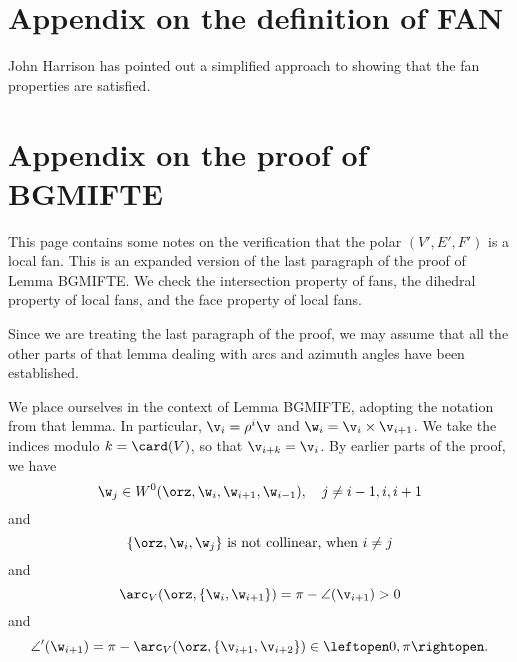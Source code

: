 
\newpage

\section{Appendix on the definition of FAN}

John Harrison has pointed out a simplified approach to showing that
the fan properties are satisfied.

\newpage
\section{Appendix on the proof of BGMIFTE}

This page contains some notes on the verification that the polar $(V',E',F')$ is
a local fan.   This is an expanded version of  the last paragraph
of the proof of Lemma BGMIFTE.
We check the intersection property of fans, the dihedral property
of local fans, and the face property of local fans.

Since we are treating the last paragraph of the
proof, we may assume that all the other parts of that lemma dealing
with arcs and azimuth angles have been established.

We place ourselves in the context of Lemma BGMIFTE, adopting the
notation from that lemma.  
In particular, $\v_i = \rho^i\v$ and
$\w_i = \v_i \times \v_{i+1}$.  
We take the indices modulo $k=\card(V)$, so that $\v_{i+k}=\v_i$.
By earlier parts of the proof, we have
\begin{equation}\label{eqn:wj'}
\w_j\in W^0(\orz,\w_{i},\w_{i+1},\w_{i-1}),\quad j\ne i-1, i, i+1
\end{equation}
and
\begin{equation}\label{eqn:colw'}
\{\orz,\w_i,\w_j\} \text{ is not collinear, when } i\ne j
\end{equation}  
and
\begin{equation}\label{eqn:arcV'}
\arc_V(\orz,\{\w_i,\w_{i+1}\}) 
=\pi - \angle(\v_{i+1}) >0
\end{equation}
and
\begin{equation}\label{eqn:angle'}
\angle'(\w_{i+1}) 
=\pi -\arc_V(\orz,\{\v_{i+1},\v_{i+2}\})  \in\leftopen 0,\pi\rightopen.
\end{equation}

